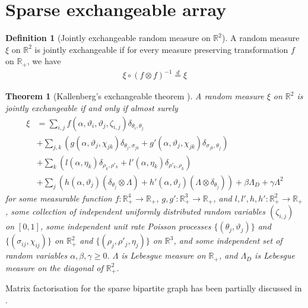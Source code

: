 \documentclass{article}
\newtheorem{theorem}{Theorem} %
\theoremstyle{definition}
\newtheorem{definition}{Definition}
\begin{document}
\section{Sparse exchangeable array}
\begin{definition}[Jointly exchangeable random measure on $\mathbb{R}^2$] A random measure $\xi$ on $\mathbb{R}^2$ is jointly exchangeable if for every measure preserving transformation $f$ on $\mathbb{R}_+$, we have
\begin{align}
\xi \circ (f \otimes f)^{-1} \stackrel{d}{=} \xi
\end{align}
\end{definition}
\begin{theorem}[Kallenberg's exchangeable theorem \cite{Kallenberg1990}] A random measure $\xi$ on $\mathbb{R}^2$ is jointly exchangeable if and only if almost surely
\begin{align}
\xi &= \sum_{i,j} f(\alpha, \vartheta_i, \vartheta_j, \zeta_{i,j})\delta_{\theta_i, \theta_j} \\
&+ \sum_{j,k}(g(\alpha, \vartheta_j, \chi_{jk})\delta_{\theta_j,\sigma_{jk}} + g'(\alpha, \vartheta_j, \chi_{jk})\delta_{\sigma_{jk},\theta_j})\\
&+ \sum_{k}(l(\alpha, \eta_k)\delta_{\rho_k,\rho'_k} + l'(\alpha, \eta_k)\delta_{\rho'_k, \rho_k})\\
&+\sum_j(h(\alpha, \vartheta_j)(\delta_{\theta_j} \otimes \Lambda) + h'(\alpha, \vartheta_j)(\Lambda \otimes \delta_{\theta_j})) + \beta\Lambda_D + \gamma \Lambda^2
\end{align}
for some measurable function $f:\mathbb{R}_+^4 \rightarrow \mathbb{R}_+$, $g,g':\mathbb{R}_+^3 \rightarrow \mathbb{R}_+$, and $l, l', h, h': \mathbb{R}_+^2\rightarrow\mathbb{R}_+$, some collection of independent uniformly distributed random variables $(\zeta_{i,j})$ on $[0,1]$, some independent unit rate Poisson processes $\{(\theta_j, \vartheta_j)\}$ and $\{(\sigma_{ij}, \chi_{ij})\}$ on $\mathbb{R}_+^2$ and $\{(\rho_j, \rho'_j, \eta_j)\}$ on $\mathbb{R}^3$, and some independent set of random variables $\alpha, \beta, \gamma \geq 0$. $\Lambda$ is Lebesgue measure on $\mathbb{R}_+$, and $\Lambda_D$ is Lebesgue measure on the diagonal of $\mathbb{R}_+^2$.
\end{theorem}

Matrix factorisation for the sparse bipartite graph has been partially discussed in \cite{Caron2012}.



\end{document}
